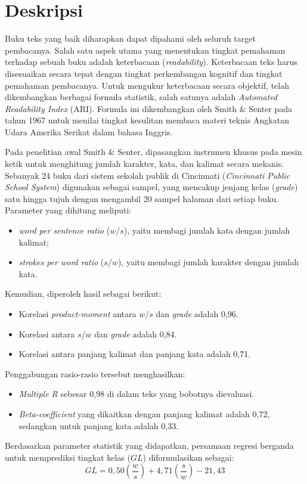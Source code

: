 \documentclass[a4paper,twoside]{article}
\title{\judultopik}
\author{\nama \textendash \npm}
\begin{document}

\maketitle


\section{Deskripsi}
Buku teks yang baik diharapkan dapat dipahami oleh seluruh target pembacanya. Salah satu aspek utama yang menentukan tingkat pemahaman terhadap sebuah buku adalah keterbacaan (\textit{readability}). Keterbacaan teks harus disesuaikan secara tepat dengan tingkat perkembangan kognitif dan tingkat pemahaman pembacanya. Untuk mengukur keterbacaan secara objektif, telah dikembangkan berbagai formula statistik, salah satunya adalah \textit{Automated Readability Index} (ARI). Formula ini dikembangkan oleh Smith \& Senter pada tahun 1967 untuk menilai tingkat kesulitan membaca materi teknis Angkatan Udara Amerika Serikat dalam bahasa Inggris.

Pada penelitian awal Smith \& Senter, dipasangkan instrumen khusus pada mesin ketik untuk menghitung jumlah karakter, kata, dan kalimat secara mekanis. Sebanyak 24 buku dari sistem sekolah publik di Cincinnati (\textit{Cincinnati Public School System}) digunakan sebagai sampel, yang mencakup jenjang kelas (\textit{grade}) satu hingga tujuh dengan mengambil 20 sampel halaman dari setiap buku. Parameter yang dihitung meliputi:
\begin{itemize}
    \item \textit{word per sentence ratio} ($w/s$), yaitu membagi jumlah kata dengan jumlah kalimat;
    \item \textit{strokes per word ratio} ($s/w$), yaitu membagi jumlah karakter dengan jumlah kata.
\end{itemize}
Kemudian, diperoleh hasil sebagai berikut:
\begin{itemize}
    \item Korelasi \textit{product-moment} antara $w/s$ dan \textit{grade} adalah 0,96.
    \item Korelasi antara $s/w$ dan \textit{grade} adalah 0,84.
    \item Korelasi antara panjang kalimat dan panjang kata adalah 0,71.
\end{itemize}
Penggabungan rasio-rasio tersebut menghasilkan:
\begin{itemize}
    \item \textit{Multiple R} sebesar 0,98 di dalam teks yang bobotnya dievaluasi.
    \item \textit{Beta-coefficient} yang dikaitkan dengan panjang kalimat adalah 0,72, sedangkan untuk panjang kata adalah 0,33.
\end{itemize}
Berdasarkan parameter statistik yang didapatkan, persamaan regresi berganda untuk memprediksi tingkat kelas ($GL$) diformulasikan sebagai:
\begin{equation}
GL = 0{,}50\left(\frac{w}{s}\right)
   + 4{,}71\left(\frac{s}{w}\right)
   - 21{,}43
\end{equation}
\end{document}
